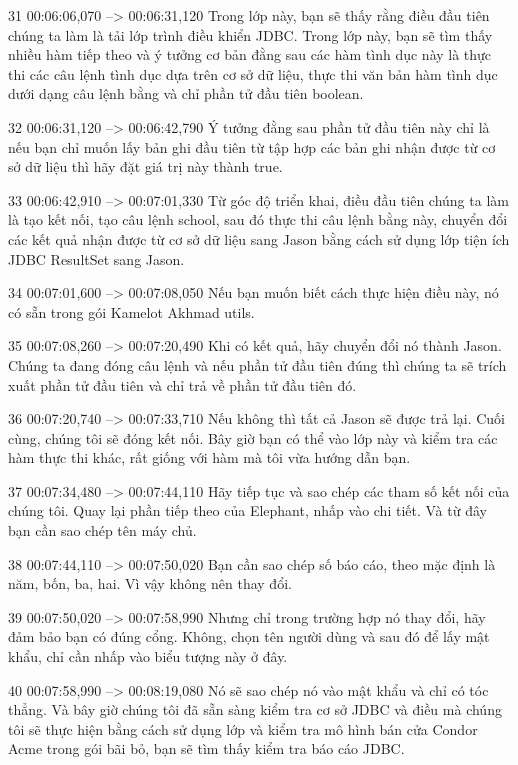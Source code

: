 31
00:06:06,070 --> 00:06:31,120
Trong lớp này, bạn sẽ thấy rằng điều đầu tiên chúng ta làm là tải lớp trình điều khiển JDBC.  Trong lớp này, bạn sẽ tìm thấy nhiều hàm tiếp theo và ý tưởng cơ bản đằng sau các hàm tình dục này là thực thi các câu lệnh tình dục dựa trên cơ sở dữ liệu, thực thi văn bản hàm tình dục dưới dạng câu lệnh bằng và chỉ phần tử đầu tiên boolean.

32
00:06:31,120 --> 00:06:42,790
Ý tưởng đằng sau phần tử đầu tiên này chỉ là nếu bạn chỉ muốn lấy bản ghi đầu tiên từ tập hợp các bản ghi nhận được từ cơ sở dữ liệu thì hãy đặt giá trị này thành true.

33
00:06:42,910 --> 00:07:01,330
Từ góc độ triển khai, điều đầu tiên chúng ta làm là tạo kết nối, tạo câu lệnh school, sau đó thực thi câu lệnh bằng này, chuyển đổi các kết quả nhận được từ cơ sở dữ liệu sang Jason bằng cách sử dụng lớp tiện ích JDBC ResultSet sang Jason.

34
00:07:01,600 --> 00:07:08,050
Nếu bạn muốn biết cách thực hiện điều này, nó có sẵn trong gói Kamelot Akhmad utils.

35
00:07:08,260 --> 00:07:20,490
Khi có kết quả, hãy chuyển đổi nó thành Jason.  Chúng ta đang đóng câu lệnh và nếu phần tử đầu tiên đúng thì chúng ta sẽ trích xuất phần tử đầu tiên và chỉ trả về phần tử đầu tiên đó.

36
00:07:20,740 --> 00:07:33,710
Nếu không thì tất cả Jason sẽ được trả lại.  Cuối cùng, chúng tôi sẽ đóng kết nối.  Bây giờ bạn có thể vào lớp này và kiểm tra các hàm thực thi khác, rất giống với hàm mà tôi vừa hướng dẫn bạn.

37
00:07:34,480 --> 00:07:44,110
Hãy tiếp tục và sao chép các tham số kết nối của chúng tôi.  Quay lại phần tiếp theo của Elephant, nhấp vào chi tiết.  Và từ đây bạn cần sao chép tên máy chủ.

38
00:07:44,110 --> 00:07:50,020
Bạn cần sao chép số báo cáo, theo mặc định là năm, bốn, ba, hai.  Vì vậy không nên thay đổi.

39
00:07:50,020 --> 00:07:58,990
Nhưng chỉ trong trường hợp nó thay đổi, hãy đảm bảo bạn có đúng cổng.  Không, chọn tên người dùng và sau đó để lấy mật khẩu, chỉ cần nhấp vào biểu tượng này ở đây.

40
00:07:58,990 --> 00:08:19,080
Nó sẽ sao chép nó vào mật khẩu và chỉ có tóc thẳng.  Và bây giờ chúng tôi đã sẵn sàng kiểm tra cơ sở JDBC và điều mà chúng tôi sẽ thực hiện bằng cách sử dụng lớp và kiểm tra mô hình bán cửa Condor Acme trong gói bãi bỏ, bạn sẽ tìm thấy kiểm tra báo cáo JDBC.

